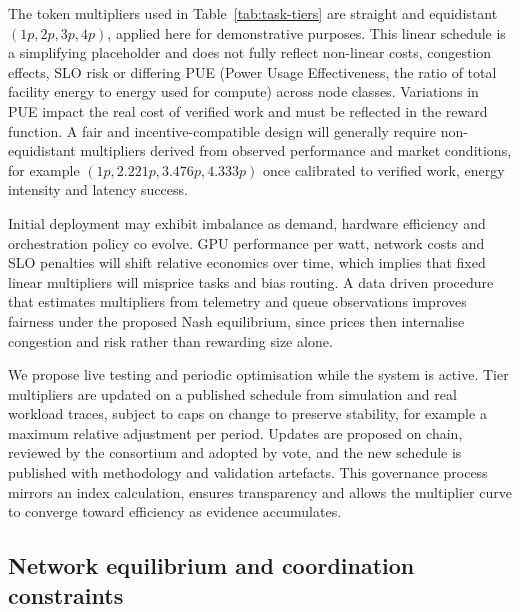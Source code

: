 \documentclass[oneside,10pt]{swissi}
\begin{document}
The token multipliers used in Table~\ref{tab:task-tiers} are straight and equidistant \((1p, 2p, 3p, 4p)\), applied here for demonstrative purposes. This linear schedule is a simplifying placeholder and does not fully reflect non-linear costs, congestion effects, SLO risk or differing PUE (Power Usage Effectiveness, the ratio of total facility energy to energy used for compute) across node classes. Variations in PUE impact the real cost of verified work and must be reflected in the reward function. A fair and incentive-compatible design will generally require non-equidistant multipliers derived from observed performance and market conditions, for example \((1p, 2.221p, 3.476p, 4.333p)\) once calibrated to verified work, energy intensity and latency success.

Initial deployment may exhibit imbalance as demand, hardware efficiency and orchestration policy co evolve. GPU performance per watt, network costs and SLO penalties will shift relative economics over time, which implies that fixed linear multipliers will misprice tasks and bias routing. A data driven procedure that estimates multipliers from telemetry and queue observations improves fairness under the proposed Nash equilibrium, since prices then internalise congestion and risk rather than rewarding size alone.

We propose live testing and periodic optimisation while the system is active. Tier multipliers are updated on a published schedule from simulation and real workload traces, subject to caps on change to preserve stability, for example a maximum relative adjustment per period. Updates are proposed on chain, reviewed by the consortium and adopted by vote, and the new schedule is published with methodology and validation artefacts. This governance process mirrors an index calculation, ensures transparency and allows the multiplier curve to converge toward efficiency as evidence accumulates.

\subsection{Network equilibrium and coordination constraints}
\end{document}
